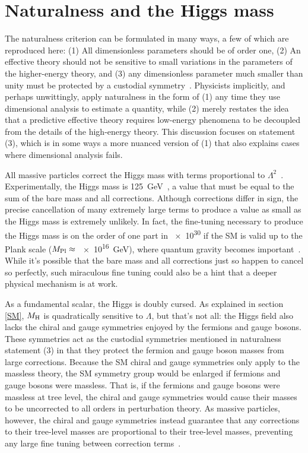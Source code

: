 \documentclass[12pt]{article}
\begin{document}
\section{Naturalness and the Higgs mass}
    The naturalness criterion can be formulated in many ways, a few of which are reproduced here: (1) All dimensionless parameters should be of order one, (2) An effective theory should not be sensitive to small variations in the parameters of the higher-energy theory, and (3) any dimensionless parameter much smaller than unity must be protected by a custodial symmetry~\cite{giudice_naturally, thooft_naturalness}. Physicists implicitly, and perhaps unwittingly, apply naturalness in the form of (1) any time they use dimensional analysis to estimate a quantity, while (2) merely restates the idea that a predictive effective theory requires low-energy phenomena to be decoupled from the details of the high-energy theory. This discussion focuses on statement (3), which is in some ways a more nuanced version of (1) that also explains cases where dimensional analysis fails.

    All massive particles correct the Higgs mass with terms proportional to $\Lambda^2$~\cite{dine_naturalness}. Experimentally, the Higgs mass is \SI{125}{\giga\electronvolt}~\cite{cms_higgs, atlas_higgs}, a value that must be equal to the sum of the bare mass and all corrections. Although corrections differ in sign, the precise cancellation of many extremely large terms to produce a value as small as the Higgs mass is extremely unlikely. In fact, the fine-tuning necessary to produce the Higgs mass is on the order of one part in \num{e30} if the SM is valid up to the Plank scale ($M_{\mathrm{Pl}}\approx$ \SI{e16}{\giga\electronvolt}), where quantum gravity becomes important~\cite{giudice_naturally}. While it's possible that the bare mass and all corrections just so happen to cancel so perfectly, such miraculous fine tuning could also be a hint that a deeper physical mechanism is at work.
    
    As a fundamental scalar, the Higgs is doubly cursed. As explained in section \ref{SM}, $M_{\mathrm{H}}$ is quadratically sensitive to $\Lambda$, but that's not all: the Higgs field also lacks the chiral and gauge symmetries enjoyed by the fermions and gauge bosons. These symmetries act as the custodial symmetries mentioned in naturalness statement (3) in that they protect the fermion and gauge boson masses from large corrections. Because the SM chiral and gauge symmetries only apply to the massless theory, the SM symmetry group would be enlarged if fermions and gauge bosons were massless. That is, if the fermions and gauge bosons were massless at tree level, the chiral and gauge symmetries would cause their masses to be uncorrected to all orders in perturbation theory. As massive particles, however, the chiral and gauge symmetries instead guarantee that any corrections to their tree-level masses are proportional to their tree-level masses, preventing any large fine tuning between correction terms~\cite{giudice_naturally}.  
\end{document}

